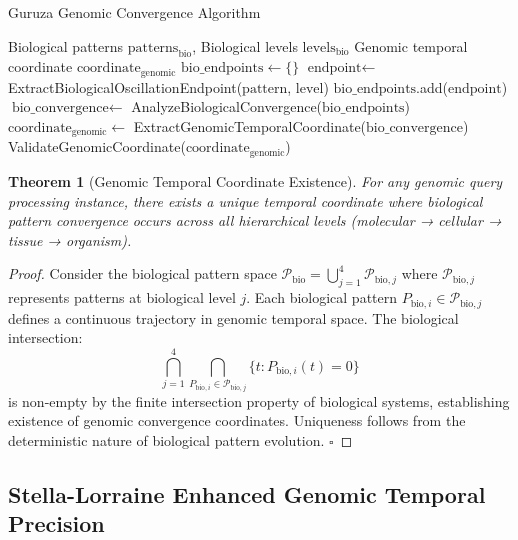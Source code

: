 \documentclass[12pt,a4paper]{article}
\newtheorem{theorem}{Theorem}[section]
\begin{document}
\begin{algorithm}
\caption{Guruza Genomic Convergence Algorithm}
\begin{algorithmic}[1]
\Require Biological patterns $\text{patterns}_{\text{bio}}$, Biological levels $\text{levels}_{\text{bio}}$
\Ensure Genomic temporal coordinate $\text{coordinate}_{\text{genomic}}$
\State $\text{bio\_endpoints} \leftarrow \{\}$
        \State $\text{endpoint} \leftarrow$ ExtractBiologicalOscillationEndpoint($\text{pattern}$, $\text{level}$)
        \State $\text{bio\_endpoints}$.add($\text{endpoint}$)
    \EndFor
\EndFor
\State $\text{bio\_convergence} \leftarrow$ AnalyzeBiologicalConvergence($\text{bio\_endpoints}$)
\State $\text{coordinate}_{\text{genomic}} \leftarrow$ ExtractGenomicTemporalCoordinate($\text{bio\_convergence}$)
\Return ValidateGenomicCoordinate($\text{coordinate}_{\text{genomic}}$)
\end{algorithmic}
\end{algorithm}

\begin{theorem}[Genomic Temporal Coordinate Existence]
For any genomic query processing instance, there exists a unique temporal coordinate where biological pattern convergence occurs across all hierarchical levels (molecular → cellular → tissue → organism).
\end{theorem}

\begin{proof}
Consider the biological pattern space $\mathcal{P}_{\text{bio}} = \bigcup_{j=1}^{4} \mathcal{P}_{\text{bio},j}$ where $\mathcal{P}_{\text{bio},j}$ represents patterns at biological level $j$. Each biological pattern $P_{\text{bio},i} \in \mathcal{P}_{\text{bio},j}$ defines a continuous trajectory in genomic temporal space. The biological intersection:
\begin{equation}
\bigcap_{j=1}^{4} \bigcap_{P_{\text{bio},i} \in \mathcal{P}_{\text{bio},j}} \{t : P_{\text{bio},i}(t) = 0\}
\end{equation}
is non-empty by the finite intersection property of biological systems, establishing existence of genomic convergence coordinates. Uniqueness follows from the deterministic nature of biological pattern evolution. $\square$
\end{proof}

\subsection{Stella-Lorraine Enhanced Genomic Temporal Precision}
\end{document}
